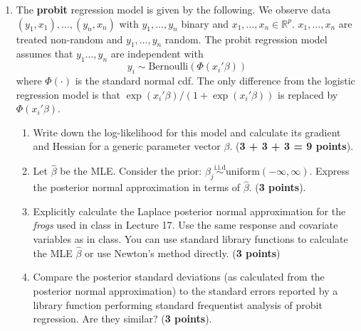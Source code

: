 \documentclass{scrartcl}
\newcommand{\R}{{\mathbb R}}
\begin{document}
\begin{enumerate}
 \item The \textbf{probit} regression model is given by the following. We
  observe data $(y_1, x_1), \dots, (y_n, x_n)$ with
  $y_1, \dots, y_n$ binary and $x_1, \dots, x_n \in \R^p$. $x_1,
  \dots, x_n$ are treated non-random and $y_1, \dots, y_n$ random. The
  probit regression model assumes 
  that $y_1 \dots, y_n$ are independent with
  \begin{equation*}
    y_i \sim \text{Bernoulli} \left(\Phi(x_i'
      \beta) \right)
  \end{equation*}
  where $\Phi(\cdot)$ is the standard normal cdf. The only difference
  from the logistic regression model is that $\exp(x_i'\beta)/(1 +
  \exp(x_i'\beta))$ is replaced by $\Phi(x_i'\beta)$. 
  \begin{enumerate}
  \item Write down the log-likelihood for this model and calculate its
    gradient and Hessian for a generic parameter vector $\beta$. (\textbf{3 +
      3 + 3 = 9 points}).
   \item Let $\hat{\beta}$ be the MLE. Consider the
  prior: $\beta_j \overset{\text{i.i.d}}{\sim} \text{uniform}(-\infty,
  \infty)$. Express the posterior normal
     approximation in terms of $\hat{\beta}$. (\textbf{3 points}). 
   \item Explicitly calculate the Laplace posterior normal approximation for
     the \textit{frogs} used in class in Lecture 17. Use the same response and
     covariate variables as in class. You can use standard library
     functions to calculate the MLE
     $\hat{\beta}$ or use Newton's method directly.  (\textbf{3 points})
\item Compare the posterior standard
     deviations (as calculated from the posterior normal
     approximation) to the standard errors reported by a library
     function performing standard frequentist
     analysis of probit regression. Are they similar?
     (\textbf{3  points}).
     \end{enumerate}


\end{enumerate}
\end{document}
